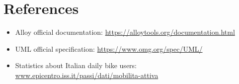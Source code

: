 \documentclass{Configuration_Files/PoliMi3i_thesis}
\begin{document}
\chapter{References}
\begin{itemize}
    \item Alloy official documentation: \url{https://alloytools.org/documentation.html }
    \item UML official specification: \url{https://www.omg.org/spec/UML/}
    \item Statistics about Italian daily bike users: 
    \\
    \url{www.epicentro.iss.it/passi/dati/mobilita-attiva}
    \label{security}
\end{itemize}


\listoffigures

\listoftables

\cleardoublepage
\end{document}
